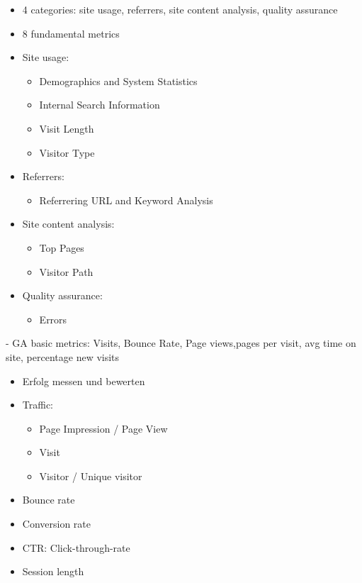 \begin{itemize}
\item 4 categories: site usage, referrers, site content analysis, quality assurance
\item 8 fundamental metrics
\item Site usage:
	\begin{itemize}
	\item Demographics and System Statistics
	\item Internal Search Information
	\item Visit Length
	\item Visitor Type
	\end{itemize}
\item Referrers:
	\begin{itemize}
	\item Referrering URL and Keyword Analysis
	\end{itemize}
\item Site content analysis:
	\begin{itemize}
	\item Top Pages
	\item Visitor Path
	\end{itemize}
\item Quality assurance:
	\begin{itemize}
	\item Errors
	\end{itemize}
\end{itemize}



- GA basic metrics: Visits, Bounce Rate, Page views,pages per visit, avg time on site, percentage new visits


\begin{itemize}
\item Erfolg messen und bewerten
\item Traffic:
	\begin{itemize}
	\item Page Impression / Page View
	\item Visit
	\item Visitor / Unique visitor
	\end{itemize}
\item Bounce rate
\item Conversion rate
\item CTR: Click-through-rate
\item Session length
\end{itemize}



